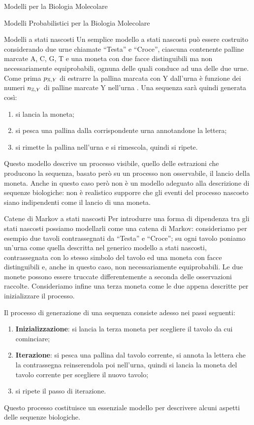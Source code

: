 \documentclass{article}
\begin{document}
\begin{section}{Modelli per la Biologia Molecolare}
\begin{subsection}{Modelli Probabilistici per la Biologia Molecolare}
\begin{subsubsection}{Modelli a stati nascosti}
				Un semplice modello a stati nascosti può essere costruito considerando due urne chiamate “Testa” e “Croce”, ciascuna contenente palline marcate A, C, G, T e una moneta con due facce distinguibili ma non necessariamente equiprobabili, ognuna delle quali conduce ad una delle due urne. Come prima $p_{\mathbb{X},Y}$ di estrarre la pallina marcata con Y dall’urna  è funzione dei numeri $n_{,Y}$ di palline marcate Y nell’urna \urna{Z}. 
				Una sequenza sarà quindi generata così: 
				\begin{enumerate}[1)]
					\item si lancia la moneta;
					\item si pesca una pallina dalla corrispondente urna annotandone la lettera;
					\item si rimette la pallina nell’urna e si rimescola, quindi si ripete.
				\end{enumerate}
				Questo modello descrive un processo visibile, quello delle estrazioni che producono la sequenza, basato però su un processo non osservabile, il lancio della moneta. 
				Anche in questo caso però non è un modello adeguato alla descrizione di sequenze biologiche: non è realistico supporre che gli eventi del processo nascosto siano indipendenti come il lancio di una moneta.
			\end{subsubsection}
			
			\begin{subsubsection}{Catene di Markov a stati nascosti}
				Per introdurre una forma di dipendenza tra gli stati nascosti possiamo modellarli come una catena di Markov: consideriamo per esempio due tavoli contrassegnati da “Testa” e “Croce”; su ogni tavolo poniamo un’urna come quella descritta nel generico modello a stati nascosti, contrassegnata con lo stesso simbolo del tavolo ed una moneta con facce distinguibili e, anche in questo caso, non necessariamente equiprobabili. Le due monete possono essere truccate differentemente a seconda delle osservazioni raccolte. Consideriamo infine una terza moneta come le due appena descritte per inizializzare il processo.
				
				Il processo di generazione di una sequenza consiste adesso nei passi seguenti:
				\begin{enumerate}[1)]
					\item \textbf{Inizializzazione}: si lancia la terza moneta per scegliere il tavolo da cui cominciare;
					\item \textbf{Iterazione}: si pesca una pallina dal tavolo corrente, si annota la lettera che la contrassegna reinserendola poi nell’urna, quindi si lancia la moneta del tavolo corrente per scegliere il nuovo tavolo;
					\item si ripete il passo di iterazione.
				\end{enumerate}
				Questo processo costituisce un essenziale modello per descrivere alcuni aspetti delle sequenze biologiche.
			\end{subsubsection}
			

\end{subsection}
\end{section}
\end{document}
